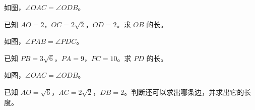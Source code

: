 \documentclass{exam-zh}
\begin{document}

\begin{problem}[points=10]
  \noindent
  \begin{minipage}[t]{\dimexpr\linewidth-60mm-6mm\relax}
    \vspace{0pt}
    如图，$\angle OAC=\angle ODB$。

已知 $AO=2$，$OC=2\sqrt{2}$，$OD=2$。求 $OB$ 的长。
    
  \end{minipage}\hfill
  \begin{diagramcoltikz}{60mm}{}
  }
  \end{diagramcoltikz}
  \par\medskip
  \answerarea[54mm]
\end{problem}



\begin{problem}[points=10]
  \noindent
  \begin{minipage}[t]{\dimexpr\linewidth-60mm-6mm\relax}
    \vspace{0pt}
    如图，$\angle PAB=\angle PDC$。

已知 $PB=3\sqrt{6}$，$PA=9$，$PC=10$。求 $PD$ 的长。
    
  \end{minipage}\hfill
  \begin{diagramcoltikz}{60mm}{}
  }
  \end{diagramcoltikz}
  \par\medskip
  \answerarea[54mm]
\end{problem}



\begin{problem}[points=10]
  \noindent
  \begin{minipage}[t]{\dimexpr\linewidth-60mm-6mm\relax}
    \vspace{0pt}
    如图，$\angle OAC=\angle ODB$。

已知 $AO=\sqrt{6}$，$AC=2\sqrt{2}$，$DB=2$。判断还可以求出哪条边，并求出它的长度。
    
  \end{minipage}\hfill
  \begin{diagramcoltikz}{60mm}{}
  }
  \end{diagramcoltikz}
  \par\medskip
  \answerarea[54mm]
\end{problem}
\end{document}
